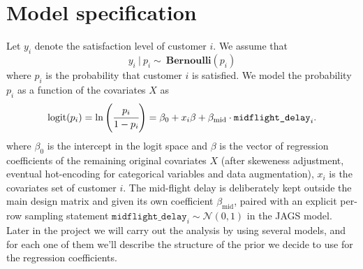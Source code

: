 \section{Model specification}
Let $y_i$ denote the satisfaction level of customer $i$. We assume that
$$
y_i\ |\ p_i\sim\ \textbf{Bernoulli}(p_i)
$$
where $p_i$ is the probability that customer $i$ is satisfied.
We model the probability $p_i$ as a function of the covariates $X$ as
$$
\text{logit}(p_i)=\ln\left(\cfrac{p_i}{1-p_i}\right) = \beta_0+x_i\beta + \beta_{\text{mid}}\cdot\texttt{midflight\_delay}_i .
    \label{eq:logit_model}
$$
where $\beta_0$ is the intercept in the logit space and $\beta$ is the vector of regression coefficients of the remaining original covariates $X$ (after skeweness adjustment, eventual hot-encoding for categorical variables and data augmentation), $x_i$ is the covariates set of customer $i$.
The mid-flight delay is deliberately kept outside the main design matrix and
given its own coefficient $\beta_{\text{mid}}$, paired with an explicit
per-row sampling statement $\texttt{midflight\_delay}_i \sim \mathcal{N}(0,1)$ in the JAGS model.
\newline
\hfill\newline
Later in the project we will carry out the analysis by using several models, and for each one of them we'll describe the structure of the prior we decide to use for the regression coefficients.

